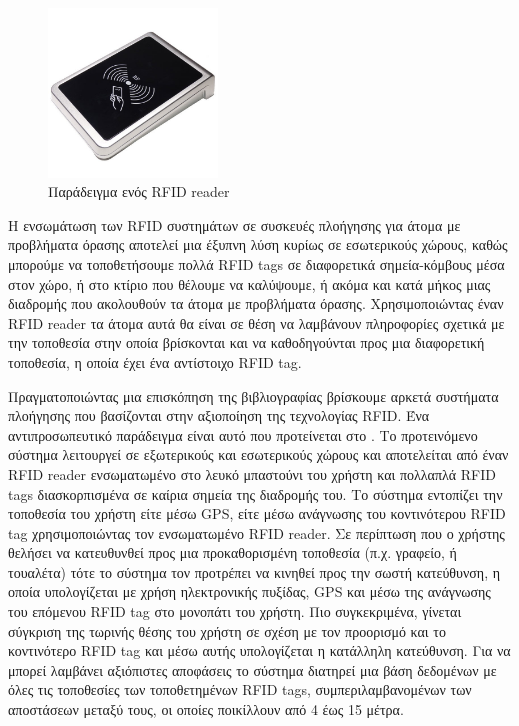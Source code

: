 \begin{figure}[H]
    \centering
    \includegraphics[width=0.4\textwidth]{images/rfid_reader.jpg}
    \caption{Παράδειγμα ενός RFID reader}
    \label{fig:rfid-reader}
\end{figure}

Η ενσωμάτωση των RFID συστημάτων σε συσκευές πλοήγησης για άτομα με προβλήματα όρασης αποτελεί μια έξυπνη λύση κυρίως σε εσωτερικούς χώρους, καθώς μπορούμε να τοποθετήσουμε πολλά RFID tags σε διαφορετικά σημεία-κόμβους μέσα στον χώρο, ή στο κτίριο που θέλουμε να καλύψουμε, ή ακόμα και κατά μήκος μιας διαδρομής που ακολουθούν τα άτομα με προβλήματα όρασης. Χρησιμοποιώντας έναν RFID reader τα άτομα αυτά θα είναι σε θέση να λαμβάνουν πληροφορίες σχετικά με την τοποθεσία στην οποία βρίσκονται και να καθοδηγούνται προς μια διαφορετική τοποθεσία, η οποία έχει ένα αντίστοιχο RFID tag.

Πραγματοποιώντας μια επισκόπηση της βιβλιογραφίας βρίσκουμε αρκετά συστήματα πλοήγησης που βασίζονται στην αξιοποίηση της τεχνολογίας RFID. Ένα αντιπροσωπευτικό παράδειγμα είναι αυτό που προτείνεται στο \cite{sammouda_mobile_2015}. Το προτεινόμενο σύστημα λειτουργεί σε εξωτερικούς και εσωτερικούς χώρους και αποτελείται από έναν RFID reader ενσωματωμένο στο λευκό μπαστούνι του χρήστη και πολλαπλά RFID tags διασκορπισμένα σε καίρια σημεία της διαδρομής του. Το σύστημα εντοπίζει την τοποθεσία του χρήστη είτε μέσω GPS, είτε μέσω ανάγνωσης του κοντινότερου RFID tag χρησιμοποιώντας τον ενσωματωμένο RFID reader. Σε περίπτωση που ο χρήστης θελήσει να κατευθυνθεί προς μια προκαθορισμένη τοποθεσία (π.χ. γραφείο, ή τουαλέτα) τότε το σύστημα τον προτρέπει να κινηθεί προς την σωστή κατεύθυνση, η οποία υπολογίζεται με χρήση ηλεκτρονικής πυξίδας, GPS και μέσω της ανάγνωσης του επόμενου RFID tag στο μονοπάτι του χρήστη. Πιο συγκεκριμένα, γίνεται σύγκριση της τωρινής θέσης του χρήστη σε σχέση με τον προορισμό και το κοντινότερο RFID tag και μέσω αυτής υπολογίζεται η κατάλληλη κατεύθυνση. Για να μπορεί λαμβάνει αξιόπιστες αποφάσεις το σύστημα διατηρεί μια βάση δεδομένων με όλες τις τοποθεσίες των τοποθετημένων RFID tags, συμπεριλαμβανομένων των αποστάσεων μεταξύ τους, οι οποίες ποικίλλουν από 4 έως 15 μέτρα.

